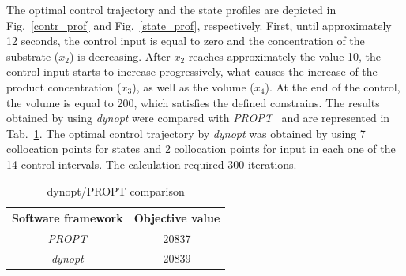 The optimal control trajectory and the state profiles are depicted in
Fig.~\ref{contr_prof} and Fig.~\ref{state_prof}, respectively. First,
until approximately 12 seconds, the control input is equal to zero and
the concentration of the substrate ($x_2$) is decreasing. After $x_2$ reaches approximately the value 10, the control input starts
to increase progressively, what causes the increase of the product
concentration ($x_3$), as well as the volume ($x_4$). At the end of the control, the
volume is equal to 200, which satisfies the defined constrains. The
results obtained by using \textit{dynopt} were compared with
\textit{PROPT}~\cite{rut10} and are represented in
Tab.~\ref{tab:compar}. The optimal control trajectory by \textit{dynopt} was obtained by using 7 collocation points for states and 2 collocation points for input in each one of the 14 control intervals. The calculation required 300 iterations.

\begin{table}[t]
	\centering
	\caption{dynopt/PROPT comparison}
	\label{tab:compar}
	\begin{tabular}{c|c}
		Software framework & Objective value \\ \hline
		\textit{PROPT} & 20837 \\
		\textit{dynopt} & 20839		
	\end{tabular}
\end{table}

